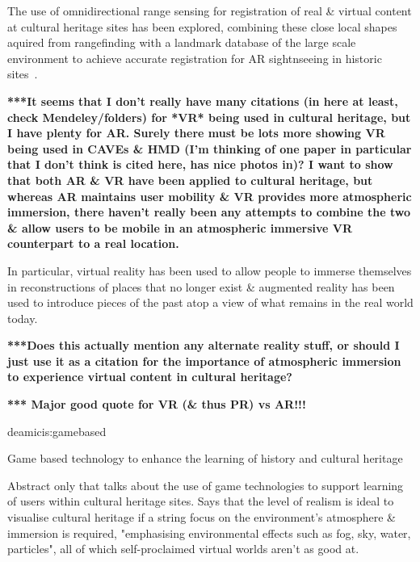 
The use of omnidirectional range sensing for registration of real \& virtual content at cultural heritage sites has been explored, combining these close local shapes aquired from rangefinding with a landmark database of the large scale environment to achieve accurate registration for AR sightnseeing in historic sites~\cite{Taketomi2011}.

\clearpage


\textbf{***It seems that I don't really have many citations (in here at least, check Mendeley/folders) for *VR* being used in cultural heritage, but I have plenty for AR. Surely there must be lots more showing VR being used in CAVEs \& HMD (I'm thinking of one paper in particular that I don't think is cited here, has nice photos in)? I want to show that both AR \& VR have been applied to cultural heritage, but whereas AR maintains user mobility \& VR provides more atmospheric immersion, there haven't really been any attempts to combine the two \& allow users to be mobile in an atmospheric immersive VR counterpart to a real location.}

In particular, virtual reality has been used to allow people to immerse themselves in reconstructions of places that no longer exist \& augmented reality has been used to introduce pieces of the past atop a view of what remains in the real world today.


\textbf{***Does this actually mention any alternate reality stuff, or should I just use it as a citation for the importance of atmospheric immersion to experience virtual content in cultural heritage?}

\textbf{*** Major good quote for VR (\& thus PR) vs AR!!!}

deamicis:gamebased

Game based technology to enhance the learning of history and cultural heritage

Abstract only that talks about the use of game technologies to support learning of users
within cultural heritage sites. Says that the level of realism is ideal to visualise cultural
heritage if a string focus on the environment's atmosphere \& immersion is required, "emphasising
environmental effects such as fog, sky, water, particles", all of which self-proclaimed virtual
worlds aren't as good at.
        

